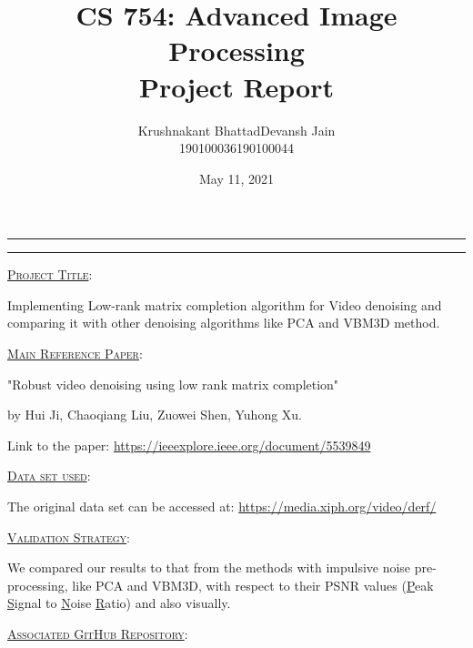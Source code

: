 \documentclass[fleqn, 11pt]{article}
\title{CS 754: Advanced Image Processing \\ Project Report}
\author{ 
\begin{tabular}{|c|c|}
     \hline
     \textsf{Krushnakant Bhattad} & \textsf{ \hspace{5pt} Devansh Jain \hspace{5pt} } \\
     \hline
     \textsf{190100036} & \textsf{190100044}\\
     \hline
\end{tabular}
}
\date{May 11, 2021}
\newcommand{\myline}{
  \par
  \kern3pt %
  \hrule height 0.5pt
  \kern2pt %
  \hrule height 0.5pt
  \kern3pt %
  \par
}
\renewcommand{\arraystretch}{2}%
\begin{document}
\maketitle
\thispagestyle{empty}
\renewcommand{\arraystretch}{1}%

\myline 

\vspace{7pt}

\underline{\large {\textsc{Project Title}}}: 

\medskip  

Implementing Low-rank matrix completion algorithm for Video denoising and comparing it with other denoising algorithms like PCA and VBM3D method. 

\hrulefill 

\vspace{10pt}

\underline{\large {\textsc{Main Reference Paper}}}: 

\medskip 

"Robust video denoising using low rank matrix completion"

by Hui Ji, Chaoqiang Liu, Zuowei Shen, Yuhong Xu.

Link to the paper: \url{https://ieeexplore.ieee.org/document/5539849}

\hrulefill

\vspace{10pt}

\underline{\large {\textsc{Data set used}}}: 

\medskip 

The original data set can be accessed at: \url{https://media.xiph.org/video/derf/}

\hrulefill

\vspace{10pt}

\underline{\large {\textsc{Validation Strategy}}}: 

\medskip 

We compared our results to that from the methods with impulsive noise pre-processing, like PCA and VBM3D, with respect to their PSNR values (\underline{P}eak \underline{S}ignal to \underline{N}oise \underline{R}atio) and also visually.

\hrulefill

\vspace{10pt}

\underline{\large {\textsc{Associated GitHub Repository}}}:

\medskip
\end{document}
